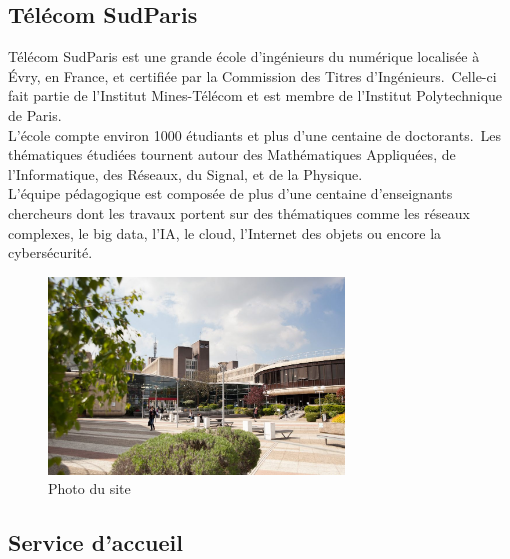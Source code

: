 
\subsection{Télécom SudParis}\label{ssec:introduction_nom_entreprise}

Télécom SudParis est une grande école d'ingénieurs du numérique localisée à Évry, en France, et certifiée par la Commission des Titres d'Ingénieurs.\
Celle-ci fait partie de l'Institut Mines-Télécom et est membre de l'Institut Polytechnique de Paris.\\
L'école compte environ 1000 étudiants et plus d'une centaine de doctorants.\
Les thématiques étudiées tournent autour des Mathématiques Appliquées, de l'Informatique, des Réseaux, du Signal, et de la Physique.\\
L'équipe pédagogique est composée de plus d'une centaine d'enseignants chercheurs dont les travaux portent sur des thématiques comme les
réseaux complexes, le big data, l'IA, le cloud, l'Internet des objets ou encore la cybersécurité.\

\begin{figure}[!h]
    \centering
    \includegraphics[width=0.7\textwidth]{img/campus_tsp.jpg}
    \caption{Photo du site}
    \label{fig:photo_site}
\end{figure}


\subsection{Service d'accueil}\label{ssec:introduction_service_accueil}


